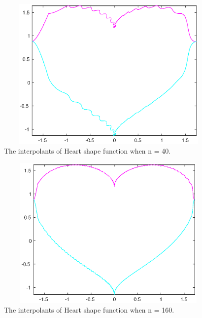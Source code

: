 \documentclass[twoside,a4paper]{article}
\begin{document}
\begin{figure}[ht]
        \centering
        \includegraphics[width=15cm, height=7.5cm]{HeartPlot_40.eps}
        \caption{The interpolants of Heart shape function when n = 40.}
\end{figure}

\begin{figure}[ht]
        \centering
        \includegraphics[width=15cm, height=7.5cm]{HeartPlot_160.eps}
        \caption{The interpolants of Heart shape function when n = 160.}
\end{figure}
\end{document}
